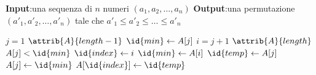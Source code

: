 \textbf{Input}:una sequenza di $n$ numeri $(a_1,a_2,\dots,a_n)$ \newline
\textbf{Output}:una permutazione $(a'_1,a'_2,\dots,a'_n)$ tale che $a'_1 \leq a'_2 \leq \dots \leq a'_n$

\begin{codebox}
\li \For $j = 1$ \To $\attrib{A}{length-1}$
    \Do
\li           $\id{min} \gets A[j]$
\li           \For $i = j+1$ \To $\attrib{A}{length}$
              \Do
\li                  \If $A[j] < \id{min}$
                     \Then
\li                         $\id{index} \gets i$
\li                         $\id{min} \gets A[i]$
                     \End
              \End
\li           $\id{temp} \gets A[j]$
\li           $A[j] \gets \id{min}$
\li           $A[\id{index}] \gets \id{temp}$
\end{codebox}
